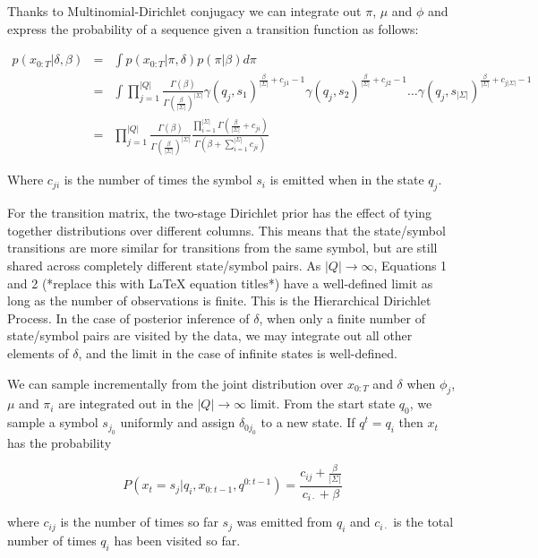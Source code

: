 \documentclass[11pt]{article}
\begin{document}
Thanks to Multinomial-Dirichlet conjugacy we can integrate out $\pi$, $\mu$ and $\phi$ and express the probability of a sequence given a transition function as follows:

\begin{eqnarray}
 p(x_{0:T}|\delta,\beta) & = & \int p(x_{0:T}|\pi,\delta) p(\pi|\beta) d\pi \\
 & = &  \int \prod_{j=1}^{|Q|} \frac{\Gamma(\beta)}{\Gamma(\frac{\beta}{|\Sigma|})^{|\Sigma|}} \gamma(q_j,s_1)^{\frac{\beta}{|\Sigma|}+c_{j1}-1} \gamma(q_j,s_2)^{\frac{\beta}{|\Sigma|}+c_{j2}-1} \ldots \gamma(q_j,s_{|\Sigma|})^{\frac{\beta}{|\Sigma|}+c_{j|\Sigma|}-1} \\
 & = & \prod_{j=1}^{|Q|} \frac{\Gamma(\beta)}{\Gamma(\frac{\beta}{|\Sigma|})^{|\Sigma|}} \frac{\prod_{i=1}^{|\Sigma|}\Gamma(\frac{\beta}{|\Sigma|} + c_{ji})}{\Gamma(\beta + \sum_{i=1}^{|\Sigma|} c_{ji})}
 \end{eqnarray}
 
 Where $c_{ji}$ is the number of times the symbol $s_i$ is emitted when in the state $q_j$.  
 
 For the transition matrix, the two-stage Dirichlet prior has the effect of tying together distributions over different columns.  This means that the state/symbol transitions are more similar for transitions from the same symbol, but are still shared across completely different state/symbol pairs.  As $|Q|\rightarrow\infty$, Equations 1 and 2 (*replace this with LaTeX equation titles*) have a well-defined limit as long as the number of observations is finite.  This is the Hierarchical Dirichlet Process.  In the case of posterior inference of $\delta$, when only a finite number of state/symbol pairs are visited by the data, we may integrate out all other elements of $\delta$, and the limit in the case of infinite states is well-defined.
 
We can sample incrementally from the joint distribution over $x_{0:T}$ and $\delta$ when $\phi_j$, $\mu$ and $\pi_i$ are integrated out in the $|Q|\rightarrow\infty$ limit.  From the start state $q_0$, we sample a symbol $s_{j_0}$ uniformly and assign $\delta_{0j_0}$ to a new state.  If $q^t = q_i$ then $x_t$ has the probability

 \[P(x_t=s_j|q_i,x_{0:t-1},q^{0:t-1}) = \frac{c_{ij}+\frac{\beta}{|\Sigma|}}{c_{i\cdot} + \beta}\]
 
 where $c_{ij}$ is the number of times so far $s_j$ was emitted from $q_i$ and $c_{i\cdot}$ is the total number of times $q_i$ has been visited so far.  
 
\end{document}
